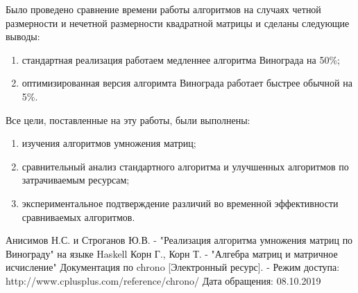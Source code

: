 \documentclass[a4paper,12pt]{article}
\begin{document}
Было проведено сравнение времени работы алгоритмов на случаях четной
размерности и нечетной размерности квадратной матрицы и сделаны
следующие выводы:

\begin{enumerate}
    \item стандартная реализация работаем медленнее алгоритма Винограда
        на 50\%;
    \item оптимизированная версия алгоримта Винограда работает быстрее
        обычной на 5\%.
\end{enumerate}

Все цели, поставленные на эту работы, были выполнены:

\begin{enumerate}
    \item изучения алгоритмов умножения матриц;
    \item сравнительный анализ стандартного алгоритма и улучшенных алгоритмов по
        затрачиваемым ресурсам;
    \item экспериментальное подтверждение различий во временной эффективности
        сравниваемых алгоритмов.
\end{enumerate}

\newpage
{}

\begin{thebibliography}{}
     Анисимов Н.С. и Строганов Ю.В. - "Реализация алгоритма умножения матриц по Винограду"
на языке Haskell
     Корн Г., Корн Т. - "Алгебра матриц и матричное исчисление"
     Документация по chrono [Электронный ресурс]. -  Режим доступа: http://www.cplusplus.com/reference/chrono/ Дата обращения: 08.10.2019
\end{thebibliography}
\end{document}
